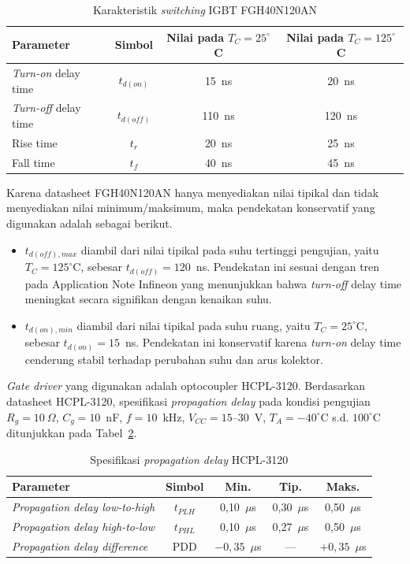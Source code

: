 \begin{table}[H]
  \centering
  \caption{Karakteristik \emph{switching} IGBT FGH40N120AN}
  \label{tab:switching-igbt}
  \begin{tabular}{|p{3.5cm}|c|c|c|}
  \hline
  \textbf{Parameter} & \textbf{Simbol} &
  \textbf{Nilai pada $T_C = 25^{\circ}$C} &
  \textbf{Nilai pada $T_C = 125^{\circ}$C} \\
  \hline
  \emph{Turn-on} delay time & $t_{d(on)}$ & 15~ns & 20~ns \\
  \hline
  \emph{Turn-off} delay time & $t_{d(off)}$ & 110~ns & 120~ns \\
  \hline
  Rise time & $t_r$ & 20~ns & 25~ns \\
  \hline
  Fall time & $t_f$ & 40~ns & 45~ns \\
  \hline
  \end{tabular}
\end{table}

Karena datasheet FGH40N120AN hanya menyediakan nilai tipikal
dan tidak menyediakan nilai minimum/maksimum, maka pendekatan
konservatif yang digunakan adalah sebagai berikut.
\begin{itemize}
  \item $t_{d(off),max}$ diambil dari nilai tipikal pada suhu
        tertinggi pengujian, yaitu $T_C = 125^{\circ}$C, sebesar
        $t_{d(off)} = 120$~ns. Pendekatan ini sesuai dengan tren
        pada Application Note Infineon yang menunjukkan bahwa
        \emph{turn-off} delay time meningkat secara signifikan
        dengan kenaikan suhu.
  \item $t_{d(on),min}$ diambil dari nilai tipikal pada suhu
        ruang, yaitu $T_C = 25^{\circ}$C, sebesar
        $t_{d(on)} = 15$~ns. Pendekatan ini konservatif karena
        \emph{turn-on} delay time cenderung stabil terhadap
        perubahan suhu dan arus kolektor.
\end{itemize}

\emph{Gate driver} yang digunakan adalah optocoupler HCPL-3120.
Berdasarkan datasheet HCPL-3120, spesifikasi \emph{propagation
delay} pada kondisi pengujian $R_g = 10~\Omega$,
$C_g = 10$~nF, $f = 10$~kHz, $V_{CC} = 15$--$30$~V,
$T_A = -40^{\circ}$C s.d. $100^{\circ}$C ditunjukkan pada
Tabel~\ref{tab:propagation-hcpl}.

\begin{table}[H]
  \centering
  \caption{Spesifikasi \emph{propagation delay} HCPL-3120}
  \label{tab:propagation-hcpl}
  \begin{tabular}{|p{5cm}|c|c|c|c|}
  \hline
  \textbf{Parameter} & \textbf{Simbol} & \textbf{Min.} &
  \textbf{Tip.} & \textbf{Maks.} \\
  \hline
  \emph{Propagation delay low-to-high} & $t_{PLH}$ &
  0{,}10~$\mu$s & 0{,}30~$\mu$s & 0{,}50~$\mu$s \\
  \hline
  \emph{Propagation delay high-to-low} & $t_{PHL}$ &
  0{,}10~$\mu$s & 0{,}27~$\mu$s & 0{,}50~$\mu$s \\
  \hline
  \emph{Propagation delay difference} & PDD &
  $-0{,}35$~$\mu$s & --- & $+0{,}35$~$\mu$s \\
  \hline
  \end{tabular}
\end{table}

